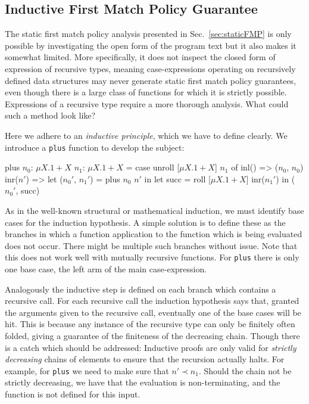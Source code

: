 \subsection{Inductive First Match Policy Guarantee}

The static first match policy analysis presented in Sec.~\ref{sec:staticFMP} is
only possible by investigating the open form of the program text but it also
makes it somewhat limited. More specifically, it does not inspect the closed
form of expression of recursive types, meaning case-expressions operating on
recursively defined data structures may never generate static first match
policy guarantees, even though there is a large class of functions for which it
is strictly possible. Expressions of a recursive type require a more thorough
analysis. What could such a method look like?

Here we adhere to an \emph{inductive principle}, which we have to define
clearly. We introduce a \texttt{plus} function to develop the subject:

\begin{rfuncode}
  plus $n_0$: $\mu X . 1 + X$ $n_1$: $\mu X . 1 + X$ =
    case unroll [$\mu X . 1 + X$] $n_1$ of
      inl() => ($n_0$, $n_0$)
      inr($n'$) => let ($n_0'$, $n_1'$) = plus $n_0$ $n'$
                 in let succ = roll [$\mu X . 1 + X$] inr($n_1'$)
                 in ($n_0'$, succ)
\end{rfuncode}

As in the well-known structural or mathematical induction, we must identify
base cases for the induction hypothesis. A simple solution is to define these
as the branches in which a function application to the function which is being
evaluated does not occur. There might be multiple such branches without issue.
Note that this does not work well with mutually recursive functions. For
\texttt{plus} there is only one base case, the left arm of the main
case-expression.

Analogously the inductive step is defined on each branch which contains a
recursive call. For each recursive call the induction hypothesis says that,
granted the arguments given to the recursive call, eventually one of the base
cases will be hit. This is because any instance of the recursive type can only
be finitely often folded, giving a guarantee of the finiteness of the decreasing
chain. Though there is a catch which should be addressed: Inductive proofs are
only valid for \emph{strictly decreasing} chains of elements to ensure that the
recursion actually halts. For example, for \texttt{plus} we need to make sure
that $n' \prec n_1$. Should the chain not be strictly decreasing, we have that
the evaluation is non-terminating, and the function is not defined for this
input.

